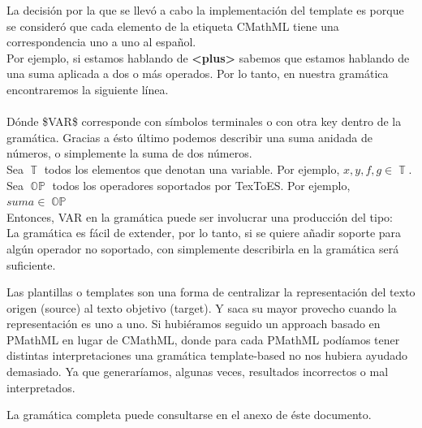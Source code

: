 La decisión por la que se llevó a cabo la implementación del template es porque se consideró que cada elemento de la etiqueta CMathML tiene una correspondencia uno a uno al español.\\

Por ejemplo, si estamos hablando de \textbf{<plus>} sabemos que estamos hablando de una suma aplicada a dos o más operados. Por lo tanto, en nuestra gramática encontraremos la siguiente línea.\\

\\

Dónde \$VAR\$ corresponde con símbolos terminales o con otra key dentro de la gramática. Gracias a ésto último podemos describir una suma anidada de números, o simplemente la suma de dos números.\\
Sea $\operatorname{\mathbb{T}}$ todos los elementos que denotan una variable. Por ejemplo, $x,y,f,g \in \operatorname{\mathbb{T}}$.\\
Sea $\operatorname{\mathbb{OP}}$ todos los operadores soportados por TexToES. Por ejemplo, $\textit{suma} \in \operatorname{\mathbb{OP}}$\\

Entonces, VAR en la gramática puede ser involucrar una producción del tipo:
\\

La gramática es fácil de extender, por lo tanto, si se quiere añadir soporte para algún operador no soportado, con simplemente describirla en la gramática será suficiente.

Las plantillas o templates son una forma de centralizar la representación del texto origen (source) al texto objetivo (target). Y saca su mayor provecho cuando la representación es uno a uno. Si hubiéramos seguido un approach basado en PMathML en lugar de CMathML, donde para cada PMathML podíamos tener distintas interpretaciones una gramática template-based no nos hubiera ayudado demasiado. Ya que generaríamos, algunas veces, resultados incorrectos o mal interpretados.

La gramática completa puede consultarse en el anexo de éste documento.